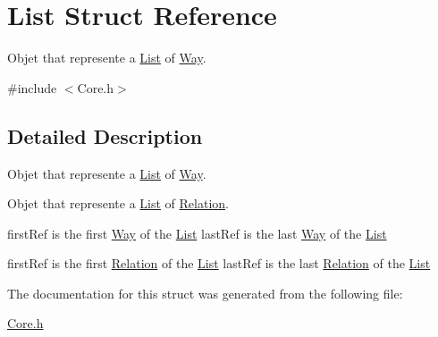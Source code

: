 \hypertarget{structList}{\section{List Struct Reference}
\label{structList}
}


Objet that represente a \hyperlink{structList}{List} of \hyperlink{structWay}{Way}.  




{\ttfamily \#include $<$Core.\-h$>$}



\subsection{Detailed Description}
Objet that represente a \hyperlink{structList}{List} of \hyperlink{structWay}{Way}. 

Objet that represente a \hyperlink{structList}{List} of \hyperlink{structRelation}{Relation}.

first\-Ref is the first \hyperlink{structWay}{Way} of the \hyperlink{structList}{List} last\-Ref is the last \hyperlink{structWay}{Way} of the \hyperlink{structList}{List}

first\-Ref is the first \hyperlink{structRelation}{Relation} of the \hyperlink{structList}{List} last\-Ref is the last \hyperlink{structRelation}{Relation} of the \hyperlink{structList}{List} 

The documentation for this struct was generated from the following file\-:\begin{DoxyCompactItemize}
\item 
\hyperlink{Core_8h}{Core.\-h}\end{DoxyCompactItemize}
